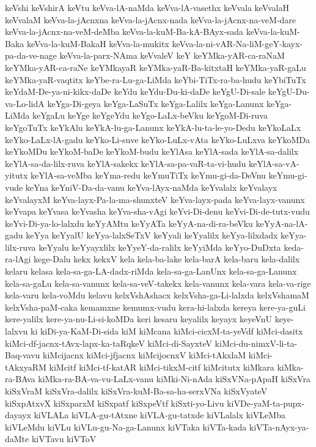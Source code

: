 {keVshi
keVshirA
keVtu
keVva-lA-naMda
keVva-lA-vasethx
keVvala
keVvalaH
keVvalaM
keVva-la-jAcnxna
keVva-la-jAcnx-nada
keVva-la-jAcnx-na-veM-dare
keVva-la-jAcnx-na-veM-deMba
keVva-la-kuM-Ba-kA-BAyx-sada
keVva-la-kuM-Baka
keVva-la-kuM-BakaH
keVva-la-mukitx
keVva-la-ni-vAR-Na-liM-geY-kayx-pa-da-ve-nage
keVva-la-parx-NAma
keVvaleV
keY
keYMka-yAR-ca-raNaM
keYMka-yAR-ca-raNe
keYMkayaR
keYMka-yaR-Ba-kitxtaH
keYMka-yaR-gaLu
keYMka-yaR-vaqtitx
keYbe-ra-Lu-ga-LiMda
keYbi-TiTx-ra-ba-hudu
keYbiTuTx
keYdaM-De-ya-ni-kikx-daDe
keYdu
keYdu-Du-ki-daDe
keYgU-Di-sale
keYgU-Du-va-Lo-lidA
keYga-Di-geya
keYga-LaSuTx
keYga-Lalilx
keYga-Lanunx
keYga-LiMda
keYgaLu
keYge
keYgeYdu
keYgo-LaLx-beVku
keYgoM-Di-ruva
keYgoTuTx
keYkAlu
keYkA-lu-ga-Lanunx
keYkA-lu-ta-le-yo-Dedu
keYkoLaLx
keYko-LaLx-lA-gadu
keYko-Li-suve
keYko-LuLx-vAta
keYko-LuLxva
keYkoMDa
keYkoMDu
keYkoM-baDe
keYkoM-budu
keYlAsa
keYlA-sada
keYlA-sa-dalilx
keYlA-sa-da-lilx-ruva
keYlA-sakekx
keYlA-sa-pa-vaR-ta-vi-hudu
keYlA-sa-vA-yitutx
keYlA-sa-veMba
keYma-redu
keYmuTiTx
keYmu-gi-da-DeVnu
keYmu-gi-vude
keYna
keYniV-Da-da-vanu
keYva-lAyx-naMda
keYvalalx
keYvalayx
keYvalayxM
keYva-layx-Pa-la-ma-shunxteV
keYva-layx-pada
keYva-layx-vanunx
keYvapa
keYvasa
keYvasha
keYva-sha-vAgi
keYvi-Di-denu
keYvi-Di-de-tutx-vudu
keYvi-Di-ya-lo-lalxdu
keYyAMtu
keYyATa
keYyA-na-di-ra-beVku
keYyA-na-lA-gadu
keYya
keYyalU
keYya-lalxSeTxV
keYyali
keYyalilx
keYya-lilxdadx
keYya-lilx-ruva
keYyalu
keYyayxlilx
keYyeY-da-ralilx
keYyiMda
keYyo-DuDxta
keda-ra-lAgi
kege-Dalu
kekx
kekxV
kela
kela-ba-lake
kela-barA
kela-baru
kela-dalilx
kelaru
kelasa
kela-sa-ga-LA-dadx-riMda
kela-sa-ga-LanUnx
kela-sa-ga-Lanunx
kela-sa-gaLu
kela-sa-vanunx
kela-sa-veV-takekx
kela-vanunx
kela-vara
kela-va-rige
kela-varu
kela-voMdu
kelavu
kelxVshAshacx
kelxVsha-ga-Li-lalxda
kelxVshamaM
kelxVsha-paM-caka
kemamxne
kemumx-vudu
kera-hi-lalxda
kereya
kere-ya-guLi
kere-yalilx
kere-ya-nu-Li-si-koMDa
keri
kesaru
keyalilx
keyayx
keyeVnU
keye-lalxvu
ki
kiDi-ya-KaM-Di-sida
kiM
kiMcana
kiMci-cicxM-ta-yeVdf
kiMci-dasitx
kiMci-df-jacnx-tAvx-lapx-ka-taRqkeV
kiMci-di-SayxteV
kiMci-du-nimxV-li-ta-Baq-vavu
kiMcijacnx
kiMci-jfjacnx
kiMcijocnxV
kiMci-tAkxlaM
kiMci-tAkxyaRM
kiMcitf
kiMci-tf-katAR
kiMci-tikxM-citf
kiMcitutx
kiMkara
kiMka-ra-BAva
kiMka-ra-BA-va-vu-LaLx-vanu
kiMki-Ni-nAda
kiSxVNa-pApaH
kiSxVra
kiSxVraM
kiSxVra-dalilx
kiSxVra-kuM-Ba-sa-ha-serxVNa
kiSxVyateV
kiSxpAtxvX
kiSxparxM
kiSxpatf
kiSxpeVtf
kiSxti-yo-Livu
kiVDe-yaM-ta-pupx-dayayx
kiVLALa
kiVLA-gu-tAtxne
kiVLA-gu-tatxde
kiVLalalx
kiVLeMba
kiVLeMdu
kiVLu
kiVLu-gu-Na-ga-Lanunx
kiVTaka
kiVTa-kada
kiVTa-nAyx-ya-daMte
kiVTavu
kiVToV
}
